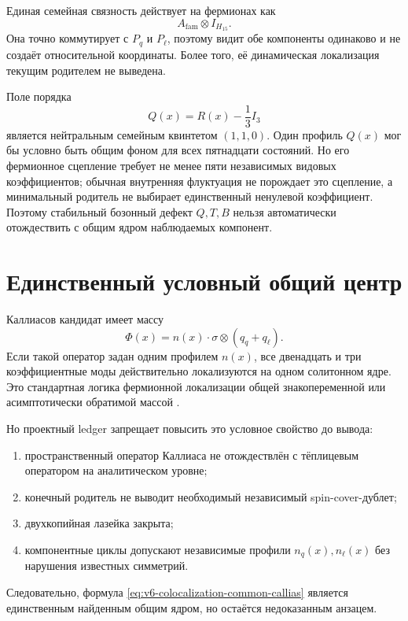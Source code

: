 Единая семейная связность действует на фермионах как
\begin{equation}
 A_{\mathrm{fam}}\otimes I_{H_{15}}.
\end{equation}
Она точно коммутирует с $P_q$ и $P_\ell$, поэтому видит обе компоненты
одинаково и не создаёт относительной координаты. Более того, её
динамическая локализация текущим родителем не выведена.

Поле порядка
\begin{equation}
 Q(x)=R(x)-\frac13I_3
\end{equation}
является нейтральным семейным квинтетом $(1,1,0)$. Один профиль $Q(x)$
мог бы условно быть общим фоном для всех пятнадцати состояний. Но его
фермионное сцепление требует не менее пяти независимых видовых
коэффициентов; обычная внутренняя флуктуация не порождает это сцепление,
а минимальный родитель не выбирает единственный ненулевой коэффициент.
Поэтому стабильный бозонный дефект $Q,T,B$ нельзя автоматически
отождествить с общим ядром наблюдаемых компонент.

\section{Единственный условный общий центр}

Каллиасов кандидат имеет массу
\begin{equation}
 \Phi(x)=n(x)\cdot\sigma\otimes(q_q+q_\ell).
 \label{eq:v6-colocalization-common-callias}
\end{equation}
Если такой оператор задан одним профилем $n(x)$, все двенадцать и три
коэффициентные моды действительно локализуются на одном солитонном ядре.
Это стандартная логика фермионной локализации общей знакопеременной или
асимптотически обратимой массой
\cite{colocalization-jackiw-rebbi1976,colocalization-callias1978}.

Но проектный ledger запрещает повысить это условное свойство до вывода:
\begin{enumerate}
 \item пространственный оператор Каллиаса не отождествлён с тёплицевым
 оператором на аналитическом уровне;
 \item конечный родитель не выводит необходимый независимый
 spin-cover-дублет;
 \item двухкопийная лазейка закрыта;
 \item компонентные циклы допускают независимые профили
 $n_q(x),n_\ell(x)$ без нарушения известных симметрий.
\end{enumerate}
Следовательно, формула \eqref{eq:v6-colocalization-common-callias} является
единственным найденным общим ядром, но остаётся недоказанным анзацем.

